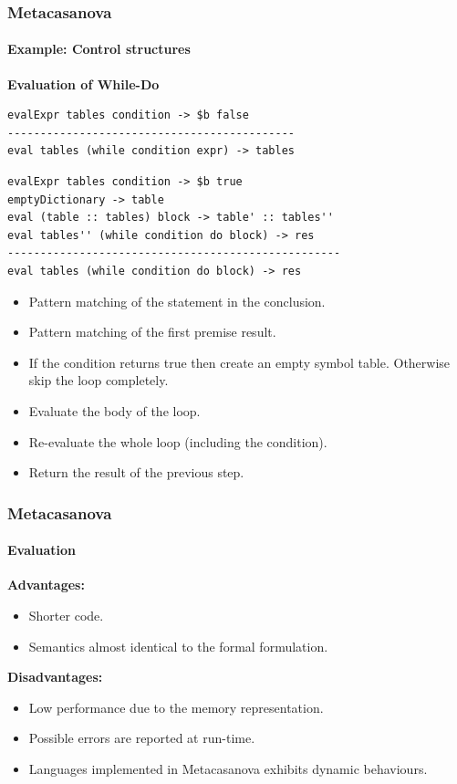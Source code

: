\documentclass[10pt,a4paper]{beamer}
\begin{document}
\begin{frame}[fragile]
\frametitle{Metacasanova}
\framesubtitle{Example: Control structures}
\textbf{Evaluation of While-Do}
\begin{lstlisting}
evalExpr tables condition -> $b false
--------------------------------------------
eval tables (while condition expr) -> tables
\end{lstlisting}

\begin{lstlisting}
evalExpr tables condition -> $b true
emptyDictionary -> table
eval (table :: tables) block -> table' :: tables''
eval tables'' (while condition do block) -> res
---------------------------------------------------
eval tables (while condition do block) -> res
\end{lstlisting}

\begin{itemize}
	\item Pattern matching of the statement in the conclusion.
	\item Pattern matching of the first premise result.
	\item If the condition returns true then create an empty symbol table. Otherwise skip the loop completely.
	\item Evaluate the body of the loop.
	\item Re-evaluate the whole loop (including the condition).
	\item Return the result of the previous step.
\end{itemize}
\end{frame}

\begin{frame}
\frametitle{Metacasanova}
\framesubtitle{Evaluation}

\textbf{Advantages:}
\begin{itemize}
	\item Shorter code.
	\item Semantics almost identical to the formal formulation.
\end{itemize}

\textbf{Disadvantages:}
\begin{itemize}
	\item Low performance due to the memory representation.
	\item Possible errors are reported at run-time.
	\item Languages implemented in Metacasanova exhibits dynamic behaviours.
\end{itemize}
\end{frame}
\end{document}
